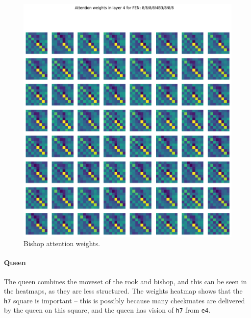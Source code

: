 \begin{figure}[H]
  \begin{minipage}{0.475\textwidth}
    \centering
    \includegraphics[width=\textwidth]{project/img/attention_maps/B_weights_4.png}
    \caption{Bishop attention weights.}
    \label{atnB1}
  \end{minipage}
\end{figure}

\paragraph{Queen} The queen combines the moveset of the rook and bishop, and
this can be seen in the heatmaps, as they are less structured. The weights
heatmap shows that the \texttt{h7} square is important -- this is possibly
because many checkmates are delivered by the queen on this square, and the
queen has vision of \texttt{h7} from \texttt{e4}.

